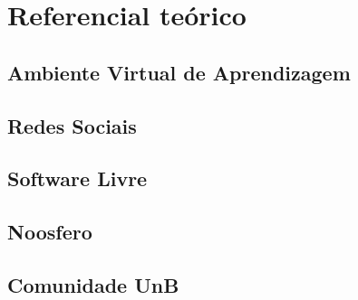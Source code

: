 \chapter{Referencial teórico}
\label{cap-referencial-teorico}

\section{Ambiente Virtual de Aprendizagem}
\label{ava}

\section{Redes Sociais}
\label{redes-sociais}

\section{Software Livre}
\label{software-livre}

\section{Noosfero}
\label{noosfero}

\section{Comunidade UnB}
\label{comunidade-unb}